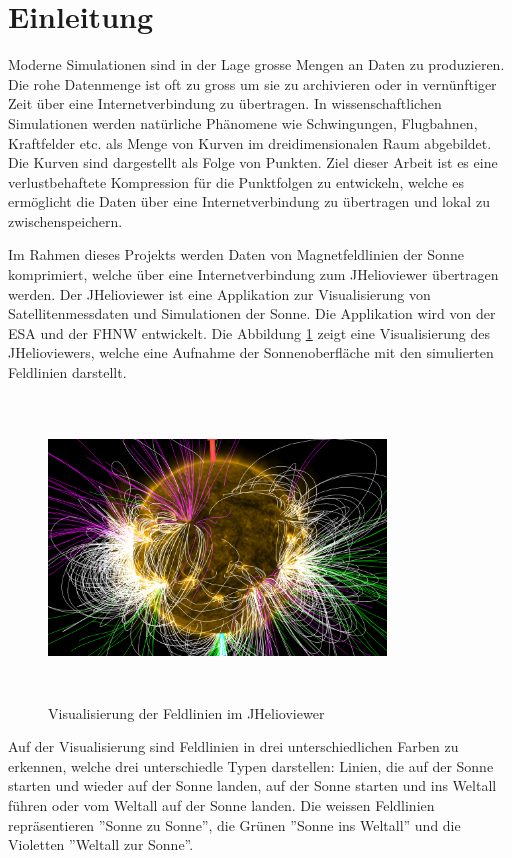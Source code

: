 \section{Einleitung}\label{einleitung}
Moderne Simulationen sind in der Lage grosse Mengen an Daten zu produzieren. Die rohe Datenmenge ist oft zu gross um sie zu archivieren oder in vernünftiger Zeit über eine Internetverbindung zu übertragen. In wissenschaftlichen Simulationen werden natürliche Phänomene wie Schwingungen, Flugbahnen, Kraftfelder etc. als Menge von Kurven im dreidimensionalen Raum abgebildet. Die Kurven sind dargestellt als Folge von Punkten. Ziel dieser Arbeit ist es eine verlustbehaftete Kompression für die Punktfolgen zu entwickeln, welche es ermöglicht die Daten über eine Internetverbindung zu übertragen und lokal zu zwischenspeichern.

Im Rahmen dieses Projekts werden Daten von Magnetfeldlinien der Sonne komprimiert, welche über eine Internetverbindung zum JHelioviewer übertragen werden. Der JHelioviewer ist eine Applikation zur Visualisierung von Satellitenmessdaten und Simulationen der Sonne. Die Applikation wird von der ESA und der FHNW entwickelt. Die Abbildung \ref{einleitung::feldlinien} zeigt eine Visualisierung des JHelioviewers, welche eine Aufnahme der Sonnenoberfläche mit den simulierten Feldlinien darstellt.

\begin{figure}[!htbp]
\center
	\includegraphics[width=0.8\textwidth,height=8cm,keepaspectratio]{./pictures/einleitung/fieldLines.png}
	\caption{Visualisierung der Feldlinien im JHelioviewer}
	\label{einleitung::feldlinien}
\end{figure}
Auf der Visualisierung sind Feldlinien in drei unterschiedlichen Farben zu erkennen, welche drei unterschiedle Typen darstellen: Linien, die auf der Sonne starten und wieder auf der Sonne landen, auf der Sonne starten und ins Weltall führen oder vom Weltall auf der Sonne landen. Die weissen Feldlinien repräsentieren ''Sonne zu Sonne'', die Grünen ''Sonne ins Weltall'' und die Violetten ''Weltall zur Sonne''.

